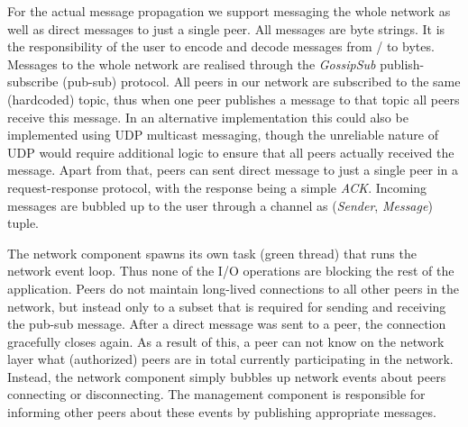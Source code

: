 For the actual message propagation we support messaging the whole network as well as direct messages to just a single peer.
All messages are byte strings. 
It is the responsibility of the user to encode and decode messages from / to bytes.
Messages to the whole network are realised through the \textit{GossipSub} publish-subscribe (pub-sub) protocol. 
All peers in our network are subscribed to the same (hardcoded) topic, thus when one peer publishes a message to that topic all peers receive this message. 
In an alternative implementation this could also be implemented using UDP multicast messaging, though the unreliable nature of UDP would require additional logic to ensure that all peers actually received the message.
Apart from that, peers can sent direct message to just a single peer in a request-response protocol, with the response being a simple \textit{ACK}.
Incoming messages are bubbled up to the user through a channel as (\textit{Sender}, \textit{Message}) tuple.

The network component spawns its own task (green thread) that runs the network event loop. 
Thus none of the I/O operations are blocking the rest of the application.
Peers do not maintain long-lived connections to all other peers in the network, but instead only to a subset that is required for sending and receiving the pub-sub message.
After a direct message was sent to a peer, the connection gracefully closes again.
As a result of this, a peer can not know on the network layer what (authorized) peers are in total currently participating in the network.
Instead, the network component simply bubbles up network events about peers connecting or disconnecting.
The management component is responsible for informing other peers about these events by publishing appropriate messages. 

\begin{minipage}{.45\textwidth}

\end{minipage}
